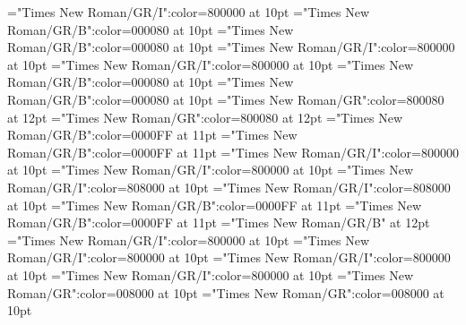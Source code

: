 \documentclass[a4paper,twoside]{article}
\begin{document}
\font\spanabbreviationvariantentrytypevariantentrytypesvariantformentrybackrefsbentry="Times New Roman/GR/I":color=800000 at 10pt
\font\spanmxbheadwordvariantformentrybackrefbvariantformentrybackrefsbentry="Times New Roman/GR/B":color=000080 at 10pt
\font\spanheadwordvariantformentrybackrefbvariantformentrybackrefsbentry="Times New Roman/GR/B":color=000080 at 10pt
\font\spanesownertypeabbreviationminimallexreferenceminimallexreferencesentry="Times New Roman/GR/I":color=800000 at 10pt
\font\spanownertypeabbreviationminimallexreferenceminimallexreferencesentry="Times New Roman/GR/I":color=800000 at 10pt
\font\spanmxbheadwordconfigtargetconfigtargetsminimallexreferenceminimallexreferencesentry="Times New Roman/GR/B":color=000080 at 10pt
\font\spanheadwordconfigtargetconfigtargetsminimallexreferenceminimallexreferencesentry="Times New Roman/GR/B":color=000080 at 10pt
\font\spanesliteralmeaningentry="Times New Roman/GR":color=800080 at 12pt
\font\spanliteralmeaningentry="Times New Roman/GR":color=800080 at 12pt
\font\spanmxbheadwordvisiblecomplexformbackrefvisiblecomplexformbackrefsentry="Times New Roman/GR/B":color=0000FF at 11pt
\font\spanheadwordvisiblecomplexformbackrefvisiblecomplexformbackrefsentry="Times New Roman/GR/B":color=0000FF at 11pt
\font\spanespartofspeechmorphosyntaxanalysesvisiblecomplexformbackrefsentry="Times New Roman/GR/I":color=800000 at 10pt
\font\spanpartofspeechmorphosyntaxanalysesvisiblecomplexformbackrefsentry="Times New Roman/GR/I":color=800000 at 10pt
\font\spanessummaryvisiblecomplexformbackrefsentry="Times New Roman/GR/I":color=808000 at 10pt
\font\spansummaryvisiblecomplexformbackrefsentry="Times New Roman/GR/I":color=808000 at 10pt
\font\spanmxbheadwordmainentrycomplex="Times New Roman/GR/B":color=0000FF at 11pt
\font\spanheadwordmainentrycomplex="Times New Roman/GR/B":color=0000FF at 11pt
\font\sensenumbersensecontentsensesmainentrycomplex="Times New Roman/GR/B" at 12pt
\font\spanespartofspeechmorphosyntaxanalysissharedgrammaticalinfosensesmainentrycomplex="Times New Roman/GR/I":color=800000 at 10pt
\font\spanpartofspeechmorphosyntaxanalysissharedgrammaticalinfosensesmainentrycomplex="Times New Roman/GR/I":color=800000 at 10pt
\font\spanespartofspeechmorphosyntaxanalysissensesensecontentsensesmainentrycomplex="Times New Roman/GR/I":color=800000 at 10pt
\font\spanpartofspeechmorphosyntaxanalysissensesensecontentsensesmainentrycomplex="Times New Roman/GR/I":color=800000 at 10pt
\font\spanesdefinitionsensesensecontentsensesmainentrycomplex="Times New Roman/GR":color=008000 at 10pt
\font\spandefinitionsensesensecontentsensesmainentrycomplex="Times New Roman/GR":color=008000 at 10pt
\end{document}
